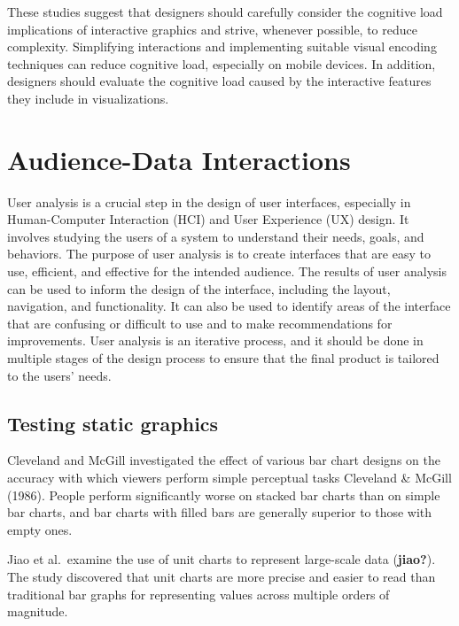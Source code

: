 \documentclass[print]{nuthesis}
\begin{document}
These studies suggest that designers should carefully consider the cognitive load implications of interactive graphics and strive, whenever possible, to reduce complexity.
Simplifying interactions and implementing suitable visual encoding techniques can reduce cognitive load, especially on mobile devices.
In addition, designers should evaluate the cognitive load caused by the interactive features they include in visualizations.

\hypertarget{audience-data-interactions}{%
\section{Audience-Data Interactions}\label{audience-data-interactions}}

User analysis is a crucial step in the design of user interfaces, especially in Human-Computer Interaction (HCI) and User Experience (UX) design.
It involves studying the users of a system to understand their needs, goals, and behaviors.
The purpose of user analysis is to create interfaces that are easy to use, efficient, and effective for the intended audience.
The results of user analysis can be used to inform the design of the interface, including the layout, navigation, and functionality.
It can also be used to identify areas of the interface that are confusing or difficult to use and to make recommendations for improvements.
User analysis is an iterative process, and it should be done in multiple stages of the design process to ensure that the final product is tailored to the users' needs.

\hypertarget{testing-static-graphics}{%
\subsection{Testing static graphics}\label{testing-static-graphics}}

Cleveland and McGill investigated the effect of various bar chart designs on the accuracy with which viewers perform simple perceptual tasks Cleveland \& McGill (1986).
People perform significantly worse on stacked bar charts than on simple bar charts, and bar charts with filled bars are generally superior to those with empty ones.

Jiao et al.~examine the use of unit charts to represent large-scale data (\textbf{jiao?}).
The study discovered that unit charts are more precise and easier to read than traditional bar graphs for representing values across multiple orders of magnitude.
\end{document}
